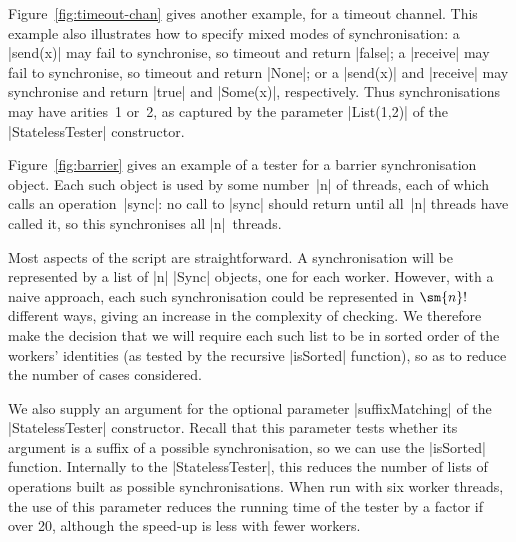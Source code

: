 
Figure~\ref{fig:timeout-chan} gives another example, for a timeout channel.
This example also illustrates how to specify mixed modes of synchronisation: a
|send(x)| may fail to synchronise, so timeout and return |false|; a |receive|
may fail to synchronise, so timeout and return |None|; or a |send(x)| and
|receive| may synchronise and return |true| and |Some(x)|, respectively.  Thus
synchronisations may have arities~1 or~2, as captured by the parameter
|List(1,2)| of the |StatelessTester| constructor.


Figure~\ref{fig:barrier}  gives an example of a
tester for a barrier synchronisation object.  Each such object is used by some
number~|n| of threads, each of which calls an operation~|sync|: no call to
|sync| should return until all~|n| threads have called it, so this
synchronises all |n|~threads.

Most aspects of the script are straightforward.  A synchronisation will be
represented by a list of |n| |Sync| objects, one for each worker.  However,
with a naive approach, each such synchronisation could be represented in
$\sm{n}!$ different ways, giving an increase in the complexity of checking.
We therefore make the decision that we will require each such list to be in
sorted order of the workers' identities (as tested by the recursive |isSorted|
function), so as to reduce the number of cases considered. 

We also supply an argument for the optional parameter |suffixMatching| of the
|StatelessTester| constructor.  Recall that this parameter tests whether its
argument is a suffix of a possible synchronisation, so we can use the
|isSorted| function.  Internally to the |StatelessTester|, this reduces the
number of lists of operations built as possible synchronisations.  When run
with six worker threads, the use of this parameter reduces the running time of
the tester by a factor if over 20, although the speed-up is less with fewer
workers. 

